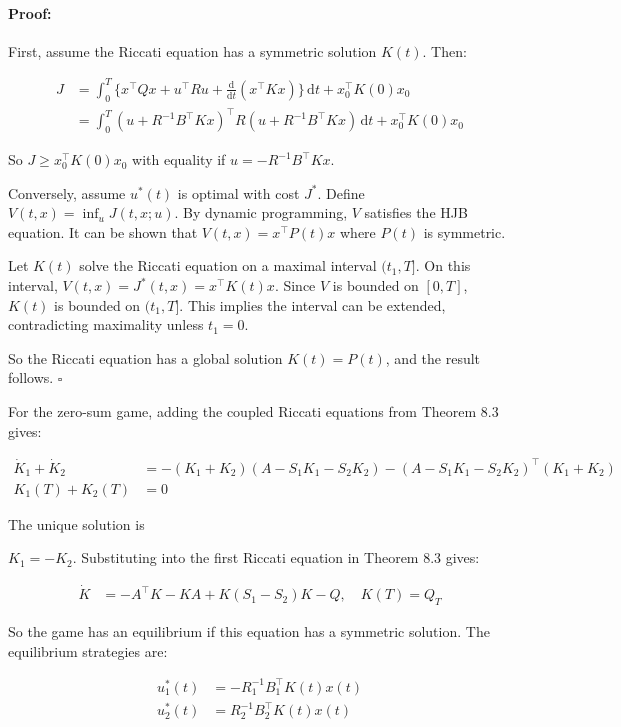 \documentclass[3p]{elsarticle}
\newenvironment{proof}{\paragraph{Proof:}}{\hfill$\square$}
\begin{document}
\begin{proof}
First, assume the Riccati equation has a symmetric solution $K(t)$. Then:

\begin{align*}
J &= \int_0^T\{x^\top Qx + u^\top Ru + \frac{\mathrm{d}}{\mathrm{d}t}(x^\top K x)\}\,\mathrm{d}t + x_0^\top K(0) x_0 \\
    &= \int_0^T (u + R^{-1}B^\top Kx)^\top R(u + R^{-1}B^\top Kx)\,\mathrm{d}t + x_0^\top K(0) x_0
\end{align*}

So $J \geq x_0^\top K(0) x_0$ with equality if $u=-R^{-1}B^\top Kx$.

Conversely, assume $u^*(t)$ is optimal with cost $J^*$. Define $V(t,x) = \inf_{u} J(t,x;u)$. By dynamic programming, $V$ satisfies the HJB equation. It can be shown that $V(t,x) = x^\top P(t) x$ where $P(t)$ is symmetric. 

Let $K(t)$ solve the Riccati equation on a maximal interval $(t_1,T]$. On this interval, $V(t,x) = J^*(t,x) = x^\top K(t) x$. Since $V$ is bounded on $[0,T]$, $K(t)$ is bounded on $(t_1,T]$. This implies the interval can be extended, contradicting maximality unless $t_1=0$.

So the Riccati equation has a global solution $K(t)=P(t)$, and the result follows.
\end{proof}

For the zero-sum game, adding the coupled Riccati equations from Theorem 8.3 gives:

\begin{align*}
\dot{K}_1 + \dot{K}_2 &= - (K_1 + K_2)(A - S_1K_1 - S_2K_2) - (A - S_1K_1 - S_2K_2)^\top(K_1 + K_2) \\
K_1(T) + K_2(T) &= 0
\end{align*}

The unique solution is

 $K_1 = -K_2$. Substituting into the first Riccati equation in Theorem 8.3 gives:

\begin{align*}
\dot{K} &= -A^\top K - KA + K(S_1-S_2)K - Q, \quad K(T) = Q_T  
\end{align*}

So the game has an equilibrium if this equation has a symmetric solution. The equilibrium strategies are:

\begin{align*}
u_1^*(t) &= -R_1^{-1}B_1^\top K(t) x(t) \\
u_2^*(t) &= R_2^{-1}B_2^\top K(t) x(t)
\end{align*}
\end{document}
